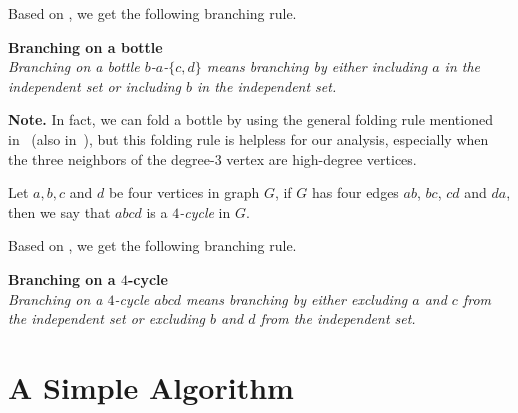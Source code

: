 \documentclass[runningheads]{llncs}
\begin{document}
 

Based on , we get the following branching rule.

\vspace{2mm}\noindent \textbf{Branching on a bottle}\\
\emph{Branching on a bottle $b$-$a$-$\{c,d\}$ means branching by
either including $a$ in the independent set or including $b$ in
the independent set.}

\noindent\textbf{Note. }In fact, we can fold a bottle by using the
general folding rule mentioned in~\cite{Fomin:is} (also
in~\cite{Beigel:is}), but this folding rule is helpless for our
analysis, especially when the three neighbors of the degree-$3$
vertex are high-degree vertices.

\vspace{2mm}Let $a,b,c$ and $d$ be four vertices in graph $G$, if
$G$ has four edges $ab$, $bc$, $cd$ and $da$, then we say that
$abcd$ is a \emph{$4$-cycle} in $G$.


Based on , we get the following branching rule.

\vspace{2mm}\noindent \textbf{Branching on a $4$-cycle}\\
\emph{Branching on a $4$-cycle $abcd$ means branching by either
excluding $a$ and $c$ from the independent set or excluding $b$
and $d$ from the independent set.}


\section{A Simple Algorithm}\label{alg}
\end{document}
